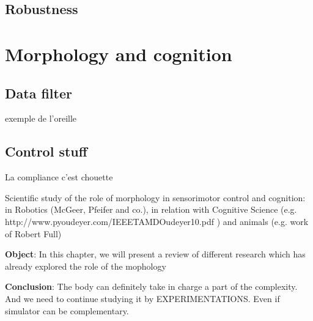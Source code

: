 \subsection{Robustness} %


\section{Morphology and cognition} %

\subsection{Data filter} %

exemple de l'oreille

\subsection{Control stuff} %

La compliance c'est chouette


Scientific study of the role of morphology in sensorimotor control and cognition: in Robotics (McGeer, Pfeifer and co.), in relation with Cognitive Science (e.g. http://www.pyoudeyer.com/IEEETAMDOudeyer10.pdf ) and animals (e.g. work of Robert Full)

\textbf{Object}: In this chapter, we will present a review of different research which has already explored the role of the mophology


\textbf{Conclusion}: The body can definitely take in charge a part of the complexity. And we need to continue studying it by EXPERIMENTATIONS. Even if simulator can be complementary.

